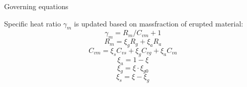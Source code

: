 \documentclass{beamer}
\begin{document}
\begin{frame}{Governing equations}
\begin{minipage}{.46\textwidth}
Specific heat ratio $\gamma_m$ is updated based on massfraction of erupted material:
\begin{equation}
\gamma_m = R_m/C_{vm} + 1 \label{eq:gov-gm}
\end{equation}
\begin{equation}
R_m = \xi_g R_g + \xi_a R_a  \label{eq:gov-Rm}
\end{equation}
\begin{equation}
C_{vm} = \xi_s C_{vs} + \xi_g C_{vg} + \xi_a C_{va} \label{eq:gov-Cvm}
\end{equation}
\begin{equation}
\xi_a = 1 - \xi \label{eq:gov-na}
\end{equation}
\begin{equation}
\xi_g = \xi \cdot \xi_{g0} \label{eq:gov-ng}
\end{equation}
\begin{equation}
\xi_s = \xi - \xi_g \label{eq:gov-ns}
\end{equation}
\end{minipage}
%
\end{frame}
%
\end{document}
